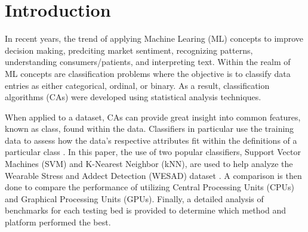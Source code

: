 \section{Introduction}
\label{sec:Introduction}

In recent years, the trend of applying Machine Learing (ML) concepts to improve decision making, predciting 
market sentiment, recognizing patterns, understanding consumers/patients, and interpreting text. 
Within the realm of ML concepts are classification problems where the objective is to classify data entries 
as either categorical, ordinal, or binary. 
As a result, classification algorithms (CAs) were developed using statistical analysis techniques. 

When applied to a dataset, CAs can provide great insight into common features, known as class,
found within the data. Classifiers in particular use the training data to assess how the data's respective 
attributes fit within the definitions of a particular class \cite{class}. In this paper, the use of two 
popular classifiers, Support Vector Machines (SVM) and K-Nearest Neighbor (kNN), are used to help 
analyze the Wearable Stress and Addect Detection (WESAD) dataset \cite{dataset}. A comparison is then done 
to compare the performance of utilizing Central Processing Units (CPUs) and Graphical Processing Units (GPUs).
Finally, a detailed analysis of benchmarks for each testing bed is provided to determine which method and 
platform performed the best.  
